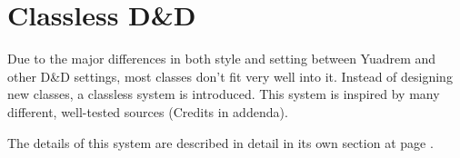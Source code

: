 
\section{Classless D\&D}
Due to the major differences in both style and setting between Yuadrem and other D\&D settings, most classes don't fit very well into it.
Instead of designing new classes, a classless system is introduced.
This system is inspired by many different, well-tested sources (Credits in addenda).

The details of this system are described in detail in its own section at page \pageref{ch::classlessdnd}.
